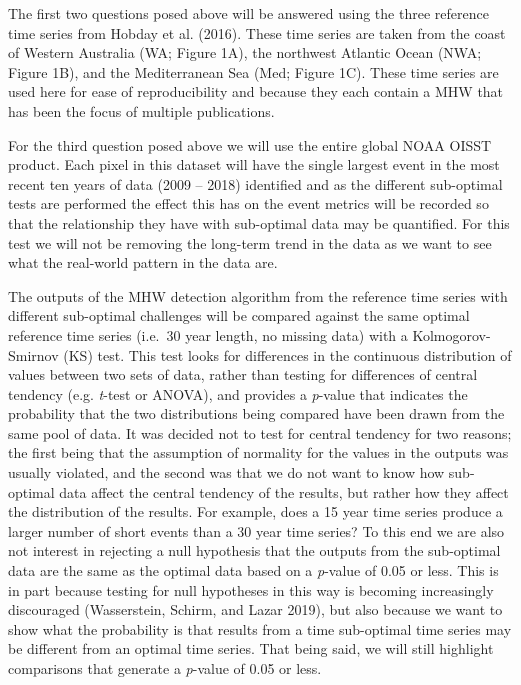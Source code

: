 \documentclass[utf8]{frontiersSCNS} %
\begin{document}
The first two questions posed above will be answered using the three
reference time series from Hobday et al. (2016). These time series are
taken from the coast of Western Australia (WA; Figure 1A), the northwest
Atlantic Ocean (NWA; Figure 1B), and the Mediterranean Sea (Med; Figure
1C). These time series are used here for ease of reproducibility and
because they each contain a MHW that has been the focus of multiple
publications.

For the third question posed above we will use the entire global NOAA
OISST product. Each pixel in this dataset will have the single largest
event in the most recent ten years of data (2009 -- 2018) identified and
as the different sub-optimal tests are performed the effect this has on
the event metrics will be recorded so that the relationship they have
with sub-optimal data may be quantified. For this test we will not be
removing the long-term trend in the data as we want to see what the
real-world pattern in the data are.

The outputs of the MHW detection algorithm from the reference time
series with different sub-optimal challenges will be compared against
the same optimal reference time series (i.e.~30 year length, no missing
data) with a Kolmogorov-Smirnov (KS) test. This test looks for
differences in the continuous distribution of values between two sets of
data, rather than testing for differences of central tendency (e.g.
\emph{t}-test or ANOVA), and provides a \emph{p}-value that indicates
the probability that the two distributions being compared have been
drawn from the same pool of data. It was decided not to test for central
tendency for two reasons; the first being that the assumption of
normality for the values in the outputs was usually violated, and the
second was that we do not want to know how sub-optimal data affect the
central tendency of the results, but rather how they affect the
distribution of the results. For example, does a 15 year time series
produce a larger number of short events than a 30 year time series? To
this end we are also not interest in rejecting a null hypothesis that
the outputs from the sub-optimal data are the same as the optimal data
based on a \emph{p}-value of 0.05 or less. This is in part because
testing for null hypotheses in this way is becoming increasingly
discouraged (Wasserstein, Schirm, and Lazar 2019), but also because we
want to show what the probability is that results from a time
sub-optimal time series may be different from an optimal time series.
That being said, we will still highlight comparisons that generate a
\emph{p}-value of 0.05 or less.
\end{document}
